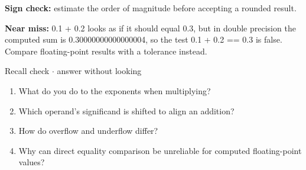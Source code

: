 \documentclass[11pt]{article}
\begin{document}
\begin{keepsection}
\begin{keepsection}
\begin{notebox}\textbf{Sign check:} estimate the order of magnitude before accepting a rounded result.\end{notebox}

\begin{notebox}\textbf{Near miss:} 0.1 + 0.2 looks as if it should equal 0.3, but in double precision the computed sum is 0.30000000000000004, so the test 0.1 + 0.2 == 0.3 is false. Compare floating-point results with a tolerance instead.\end{notebox}

\begin{recallbox}{Recall check \ensuremath{\cdot} answer without looking}
\begin{enumerate}
\item What do you do to the exponents when multiplying?
\item Which operand’s significand is shifted to align an addition?
\item How do overflow and underflow differ?
\item Why can direct equality comparison be unreliable for computed floating-point values?
\end{enumerate}

\end{recallbox}
\end{keepsection}
\end{keepsection}
\end{document}
